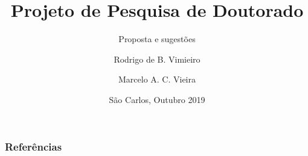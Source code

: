 \documentclass[11pt,    %
handout,            %
english,            %
xcolor=table,       %
envcountsect,       %
aspectratio=169      %
]{beamer}
\title[rodrigo.vimieiro@usp.br] %
{Projeto de Pesquisa de Doutorado}
\subtitle{Proposta e sugestões}
\author[Vimieiro, Rodrigo] %
{Rodrigo de B. Vimieiro\inst{1} \and Marcelo A. C. Vieira\inst{1}}
\institute[USP] %
{
	\inst{1}%
	Universidade de São Paulo\\
	Escola de Engenharia de São Carlos\\
	Departamento de Engenharia Elétrica\\



\begin{tikzpicture}[remember picture,overlay]
\node[anchor=north east,yshift=2pt] at (current page.north east) {\texttt{[image: figures/logo/logo\_eesc.png]}};
\end{tikzpicture}

\begin{tikzpicture}[remember picture,overlay]
\node[anchor=north west,yshift=2pt] at (current page.north west) {\texttt{[image: figures/logo/logo\_lavi.png]}};
\end{tikzpicture}

}
\date[São Carlos 2019] %
{São Carlos, Outubro 2019}
\begin{document}
 
\frame{
	\vspace{1.4cm}
	\titlepage
}








\begin{frame}
\frametitle{Referências}
\printbibliography
\end{frame}

\end{document}
